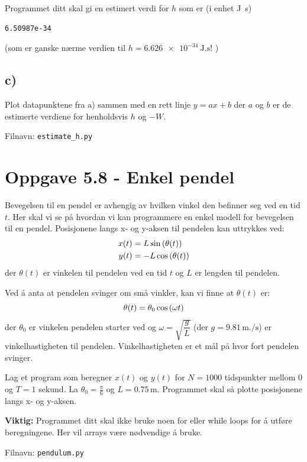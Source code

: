 \documentclass[10pt,a4paper]{article}
\begin{document}
Programmet ditt skal gi en estimert verdi for $h$ som er (i enhet \si{\joule.\second})
\begin{verbatim}
6.50987e-34
\end{verbatim}
(som er ganske nærme verdien til $h= \SI{6.626e-34}{\joule.\second}$! )
\subsection*{c)}
Plot datapunktene fra a) sammen med en rett linje $y = ax + b$ der $a$ og $b$ er de estimerte verdiene for henholdsvis $h$ og $-W$.

Filnavn: \texttt{estimate\_h.py}




\section*{Oppgave 5.8 - Enkel pendel}
Bevegelsen til en pendel er avhengig av hvilken vinkel den befinner seg ved en tid $t$.
Her skal vi se på hvordan vi kan programmere en enkel modell for bevegelsen til en pendel.
Posisjonene langs x- og y-aksen til pendelen kan uttrykkes ved:
\begin{align*}
x(t) &= L\sin\qty(\theta(t)) \\
y(t) &= -L\cos\qty(\theta(t))
\end{align*}
der $\theta(t)$ er vinkelen til pendelen ved en tid $t$ og $L$ er lengden til pendelen.

Ved å anta at pendelen svinger om små vinkler, kan vi finne at $\theta(t)$ er:
\[
\theta(t) = \theta_0\cos\qty(\omega t)
\]
der $\theta_0$ er vinkelen pendelen starter ved og $\omega = \sqrt{\dfrac{g}{L}}$ (der $g = 9.81\,\si{\meter.\per\second}$) er vinkelhastigheten til pendelen. Vinkelhastigheten er et mål på hvor fort pendelen svinger.

Lag et program som beregner $x(t)$ og $y(t)$ for $N = 1000$ tidspunkter mellom 0 og $T = 1$ sekund. La $\theta_0 = \frac{\pi}{6}$ og $L = 0.75\,\si{\meter}$. Programmet skal så plotte posisjonene langs x- og y-aksen.

\textbf{Viktig: }Programmet ditt skal ikke bruke noen for eller while loops for å utføre beregningene. Her vil arrays være nødvendige å bruke.

Filnavn: \texttt{pendulum.py}
\end{document}
